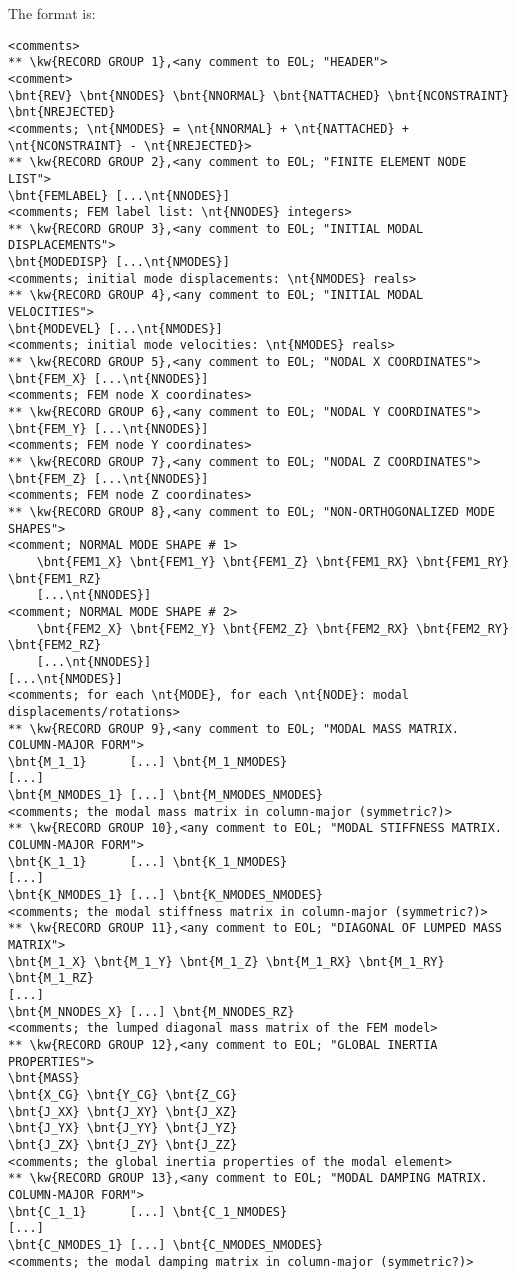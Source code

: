 The format is:
{\small
\begin{Verbatim}[commandchars=\\\{\}]
<comments>
** \kw{RECORD GROUP 1},<any comment to EOL; "HEADER">
<comment>
\bnt{REV} \bnt{NNODES} \bnt{NNORMAL} \bnt{NATTACHED} \bnt{NCONSTRAINT} \bnt{NREJECTED}
<comments; \nt{NMODES} = \nt{NNORMAL} + \nt{NATTACHED} + \nt{NCONSTRAINT} - \nt{NREJECTED}>
** \kw{RECORD GROUP 2},<any comment to EOL; "FINITE ELEMENT NODE LIST">
\bnt{FEMLABEL} [...\nt{NNODES}]
<comments; FEM label list: \nt{NNODES} integers>
** \kw{RECORD GROUP 3},<any comment to EOL; "INITIAL MODAL DISPLACEMENTS">
\bnt{MODEDISP} [...\nt{NMODES}]
<comments; initial mode displacements: \nt{NMODES} reals>
** \kw{RECORD GROUP 4},<any comment to EOL; "INITIAL MODAL VELOCITIES">
\bnt{MODEVEL} [...\nt{NMODES}]
<comments; initial mode velocities: \nt{NMODES} reals>
** \kw{RECORD GROUP 5},<any comment to EOL; "NODAL X COORDINATES">
\bnt{FEM_X} [...\nt{NNODES}]
<comments; FEM node X coordinates>
** \kw{RECORD GROUP 6},<any comment to EOL; "NODAL Y COORDINATES">
\bnt{FEM_Y} [...\nt{NNODES}]
<comments; FEM node Y coordinates>
** \kw{RECORD GROUP 7},<any comment to EOL; "NODAL Z COORDINATES">
\bnt{FEM_Z} [...\nt{NNODES}]
<comments; FEM node Z coordinates>
** \kw{RECORD GROUP 8},<any comment to EOL; "NON-ORTHOGONALIZED MODE SHAPES">
<comment; NORMAL MODE SHAPE # 1>
    \bnt{FEM1_X} \bnt{FEM1_Y} \bnt{FEM1_Z} \bnt{FEM1_RX} \bnt{FEM1_RY} \bnt{FEM1_RZ}
    [...\nt{NNODES}]
<comment; NORMAL MODE SHAPE # 2>
    \bnt{FEM2_X} \bnt{FEM2_Y} \bnt{FEM2_Z} \bnt{FEM2_RX} \bnt{FEM2_RY} \bnt{FEM2_RZ}
    [...\nt{NNODES}]
[...\nt{NMODES}]
<comments; for each \nt{MODE}, for each \nt{NODE}: modal displacements/rotations>
** \kw{RECORD GROUP 9},<any comment to EOL; "MODAL MASS MATRIX. COLUMN-MAJOR FORM">
\bnt{M_1_1}      [...] \bnt{M_1_NMODES}
[...]
\bnt{M_NMODES_1} [...] \bnt{M_NMODES_NMODES}
<comments; the modal mass matrix in column-major (symmetric?)>
** \kw{RECORD GROUP 10},<any comment to EOL; "MODAL STIFFNESS MATRIX. COLUMN-MAJOR FORM">
\bnt{K_1_1}      [...] \bnt{K_1_NMODES}
[...]
\bnt{K_NMODES_1} [...] \bnt{K_NMODES_NMODES}
<comments; the modal stiffness matrix in column-major (symmetric?)>
** \kw{RECORD GROUP 11},<any comment to EOL; "DIAGONAL OF LUMPED MASS MATRIX">
\bnt{M_1_X} \bnt{M_1_Y} \bnt{M_1_Z} \bnt{M_1_RX} \bnt{M_1_RY} \bnt{M_1_RZ}
[...]
\bnt{M_NNODES_X} [...] \bnt{M_NNODES_RZ}
<comments; the lumped diagonal mass matrix of the FEM model>
** \kw{RECORD GROUP 12},<any comment to EOL; "GLOBAL INERTIA PROPERTIES">
\bnt{MASS}
\bnt{X_CG} \bnt{Y_CG} \bnt{Z_CG}
\bnt{J_XX} \bnt{J_XY} \bnt{J_XZ}
\bnt{J_YX} \bnt{J_YY} \bnt{J_YZ}
\bnt{J_ZX} \bnt{J_ZY} \bnt{J_ZZ}
<comments; the global inertia properties of the modal element>
** \kw{RECORD GROUP 13},<any comment to EOL; "MODAL DAMPING MATRIX. COLUMN-MAJOR FORM">
\bnt{C_1_1}      [...] \bnt{C_1_NMODES}
[...]
\bnt{C_NMODES_1} [...] \bnt{C_NMODES_NMODES}
<comments; the modal damping matrix in column-major (symmetric?)>
\end{Verbatim}
}

